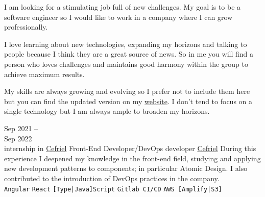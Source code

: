 \documentclass[9pt]{developercv} %
\begin{document}
\begin{minipage}[t]{0.3\textwidth}
	\vspace{-\baselineskip} %


	I am looking for a stimulating job full of new challenges.
	My goal is to be a software engineer so I would like to work in a company where
	I can grow professionally.
\end{minipage}
\hfill
\begin{minipage}[t]{0.3\textwidth}
	\vspace{-\baselineskip} %


	I love learning about new technologies,
	expanding my horizons and talking to people because I think they are a great source of news.
	So in me you will find a person who loves challenges and maintains good harmony within
	the group to achieve maximum results.
\end{minipage}
\hfill
\begin{minipage}[t]{0.3\textwidth}
	\vspace{-\baselineskip} %


	My skills are always growing and evolving so I prefer not to include them here
	but you can find the updated version on my \href{https://dagyu.netlify.app/#skills}{website}.
	I don't tend to focus on a single technology but I am always ample to broaden my horizons.
\end{minipage}




\begin{entrylist}
	\entry
	{Sep 2021 -- \\Sep 2022\\\footnotesize{internship in \href{https://www.cefriel.com/}{Cefriel}}}
	{Front-End Developer/DevOps developer}
	{\href{https://www.cefriel.com/}{Cefriel}}
	{
		During this experience I deepened my knowledge in the front-end field, studying and applying new development patterns to components; in particular Atomic Design.
		\newline I also contributed to the introduction of DevOps practices in the company.
		\\
		\texttt{Angular}\slashsep
		\texttt{React}\slashsep
		\texttt{[Type|Java]Script}\slashsep
		\texttt{Gitlab CI/CD}\slashsep
		\texttt{AWS [Amplify|S3]}
	}
\end{entrylist}
\end{document}
